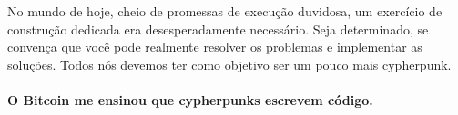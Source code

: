 No mundo de hoje, cheio de promessas de execução duvidosa, um exercício de construção dedicada 
era desesperadamente necessário. Seja determinado, se convença que você pode realmente resolver os problemas e implementar as soluções. Todos nós devemos ter como objetivo ser um pouco mais cypherpunk. 

\paragraph{O Bitcoin me ensinou que cypherpunks escrevem código.}

%
%
%
%

